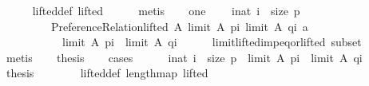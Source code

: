 \begin{isabellebody}
\ \ \ \ \isamarkupfalse%
\ lifted{\isacharunderscore}{\kern0pt}def\ lifted\isanewline
\ \ \ \ \isamarkupfalse%
\ metis\isanewline
\ \ \isamarkupfalse%
\ one{\isacharcolon}{\kern0pt}\isanewline
\ \ \ \ {\isachardoublequoteopen}{\isasymforall}i{\isacharcolon}{\kern0pt}{\isacharcolon}{\kern0pt}nat{\isachardot}{\kern0pt}\ i\ {\isacharless}{\kern0pt}\ size\ p\ {\isasymlongrightarrow}\isanewline
\ \ \ \ \ \ \ \ \ {\isacharparenleft}{\kern0pt}Preference{\isacharunderscore}{\kern0pt}Relation{\isachardot}{\kern0pt}lifted\ A\ {\isacharparenleft}{\kern0pt}limit\ A\ {\isacharparenleft}{\kern0pt}p{\isacharbang}{\kern0pt}i{\isacharparenright}{\kern0pt}{\isacharparenright}{\kern0pt}\ {\isacharparenleft}{\kern0pt}limit\ A\ {\isacharparenleft}{\kern0pt}q{\isacharbang}{\kern0pt}i{\isacharparenright}{\kern0pt}{\isacharparenright}{\kern0pt}\ a\ {\isasymor}\isanewline
\ \ \ \ \ \ \ \ \ \ \ {\isacharparenleft}{\kern0pt}limit\ A\ {\isacharparenleft}{\kern0pt}p{\isacharbang}{\kern0pt}i{\isacharparenright}{\kern0pt}{\isacharparenright}{\kern0pt}\ {\isacharequal}{\kern0pt}\ {\isacharparenleft}{\kern0pt}limit\ A\ {\isacharparenleft}{\kern0pt}q{\isacharbang}{\kern0pt}i{\isacharparenright}{\kern0pt}{\isacharparenright}{\kern0pt}{\isacharparenright}{\kern0pt}{\isachardoublequoteclose}\isanewline
\ \ \ \ \isamarkupfalse%
\ limit{\isacharunderscore}{\kern0pt}lifted{\isacharunderscore}{\kern0pt}imp{\isacharunderscore}{\kern0pt}eq{\isacharunderscore}{\kern0pt}or{\isacharunderscore}{\kern0pt}lifted\ subset\isanewline
\ \ \ \ \isamarkupfalse%
\ metis\isanewline
\ \ \isamarkupfalse%
\ {\isacharquery}{\kern0pt}thesis\isanewline
\ \ \isamarkupfalse%
\ cases\isanewline
\ \ \ \ \isamarkupfalse%
\ {\isachardoublequoteopen}{\isasymforall}i{\isacharcolon}{\kern0pt}{\isacharcolon}{\kern0pt}nat{\isachardot}{\kern0pt}\ i\ {\isacharless}{\kern0pt}\ size\ p\ {\isasymlongrightarrow}\ {\isacharparenleft}{\kern0pt}limit\ A\ {\isacharparenleft}{\kern0pt}p{\isacharbang}{\kern0pt}i{\isacharparenright}{\kern0pt}{\isacharparenright}{\kern0pt}\ {\isacharequal}{\kern0pt}\ {\isacharparenleft}{\kern0pt}limit\ A\ {\isacharparenleft}{\kern0pt}q{\isacharbang}{\kern0pt}i{\isacharparenright}{\kern0pt}{\isacharparenright}{\kern0pt}{\isachardoublequoteclose}\isanewline
\ \ \ \ \isamarkupfalse%
\ {\isacharquery}{\kern0pt}thesis\isanewline
\ \ \ \ \ \ \isamarkupfalse%
\ lifted{\isacharunderscore}{\kern0pt}def\ length{\isacharunderscore}{\kern0pt}map\ lifted\isanewline

\end{isabellebody}
